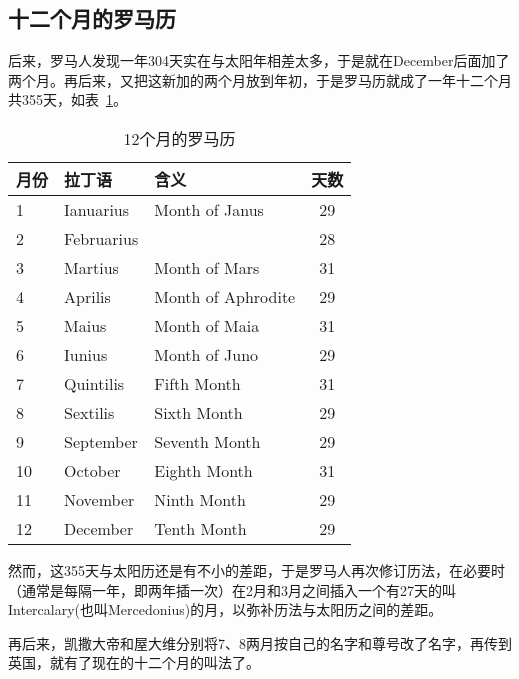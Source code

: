 \subsection{十二个月的罗马历}
\label{sec:12-months-roman-calendar}
后来，罗马人发现一年304天实在与太阳年相差太多，于是就在December后面加了两个月。再后来，又把这新加的两个月放到年初，于是罗马历就成了一年十二个月共355天，如表~\ref{tab:12-months-of-roman-calendar}。
\begin{table}[htbp]
  \centering
  \caption{12个月的罗马历}
  \label{tab:12-months-of-roman-calendar}
  \begin{minipage}{\textwidth}  %
  \centering
  \begin{tabular}{lllc}
    \toprule
    月份  & 拉丁语    & 含义              & 天数 \\\midrule
    1     & Ianuarius & Month of Janus    & 29   \\
    2     & Februarius&                   & 28   \\
    3     & Martius   & Month of Mars     & 31   \\
    4     & Aprilis   & Month of Aphrodite& 29   \\
    5     & Maius     & Month of Maia     & 31   \\
    6     & Iunius    & Month of Juno     & 29   \\
    7     & Quintilis & Fifth Month       & 31   \\
    8     & Sextilis  & Sixth Month       & 29   \\
    9     & September & Seventh Month     & 29   \\
    10    & October   & Eighth Month      & 31   \\
    11    & November  & Ninth Month       & 29   \\
    12    & December  & Tenth Month       & 29   \\
    \bottomrule
  \end{tabular}
  \end{minipage}
\end{table}

然而，这355天与太阳历还是有不小的差距，于是罗马人再次修订历法，在必要时（通常是每隔一年，即两年插一次）在2月和3月之间插入一个有27天的叫Intercalary(也叫Mercedonius)的月，以弥补历法与太阳历之间的差距。

再后来，凯撒大帝和屋大维分别将7、8两月按自己的名字和尊号改了名字，再传到英国，就有了现在的十二个月的叫法了。

